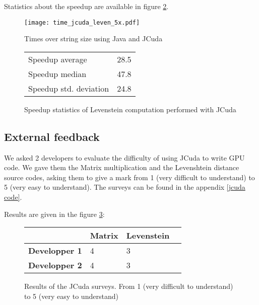 Statistics about the speedup are available in figure \ref{fig table leven jcuda}.

\begin{figure}[H]
\centering
\texttt{[image: time\_jcuda\_leven\_5x.pdf]}
\caption{Times over string size using Java and JCuda}
\label{fig: plot jcuda leven times}
\end{figure}

\begin{figure}[H]
\begin{center}
\begin{tabular}{ |l|l| } 
 \hline
 Speedup average & 28.5 \\ 
 Speedup median & 47.8 \\ 
 Speedup std. deviation & 24.8 \\ 
 \hline
\end{tabular}
\end{center}
\caption{Speedup statistics of Levenstein computation performed with JCuda}
\label{fig table leven jcuda}
\end{figure}

\subsection{External feedback}

We asked 2 developers to evaluate the difficulty of using JCuda to write GPU code. We gave them the Matrix multiplication and the Levenshtein distance source codes, asking them to give a mark from 1 (very difficult to understand) to 5 (very easy to understand). The surveys can be found in the appendix \ref{jcuda code}.

Results are given in the figure \ref{table jcuda code feedback}:

\begin{figure}[H]
\begin{center}
\begin{tabular}{ |l|l|l|l| } 
 \hline
  & \textbf{Matrix} & \textbf{Levenstein} \\
 \hline
 \textbf{Developper 1} & 4 & 3 \\ 
 \hline
 \textbf{Developper 2} & 4 & 3 \\ 
 \hline
\end{tabular}
\end{center}
\caption{Results of the JCuda surveys. From 1 (very difficult to understand) to 5 (very easy to understand)}
\label{table jcuda code feedback}
\end{figure}

